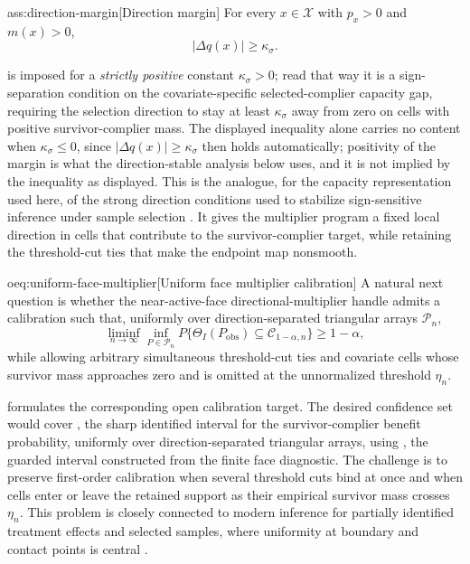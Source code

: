 \documentclass[11pt]{article}
\begin{document}
\begin{assumptionv}{ass:direction-margin}[Direction margin]
For every \(x\in\mathcal X\) with \(p_x>0\) and \(m(x)>0\),
\[
|\Delta q(x)|\ge \kappa_{\sigma}.
\]
\end{assumptionv}

 is imposed for a \emph{strictly positive} constant \(\kappa_{\sigma}>0\); read that way it is a sign-separation condition on the covariate-specific selected-complier capacity gap, requiring the selection direction to stay at least \(\kappa_{\sigma}\) away from zero on cells with positive survivor-complier mass.  The displayed inequality alone carries no content when \(\kappa_{\sigma}\le 0\), since \(|\Delta q(x)|\ge\kappa_{\sigma}\) then holds automatically; positivity of the margin is what the direction-stable analysis below uses, and it is not implied by the inequality as displayed.  This is the analogue, for the capacity representation used here, of the strong direction conditions used to stabilize sign-sensitive inference under sample selection \citep{Semenova2025}.  It gives the multiplier program a fixed local direction in cells that contribute to the survivor-complier target, while retaining the threshold-cut ties that make the endpoint map nonsmooth.

\begin{remarkv}{oeq:uniform-face-multiplier}[Uniform face multiplier calibration]
A natural next question is whether the near-active-face directional-multiplier handle admits a calibration such that, uniformly over direction-separated triangular arrays \(\mathcal P_n\),
\[
\liminf_{n\to\infty}\inf_{P\in\mathcal P_n}
P\{\Theta_I(P_{\mathrm{obs}})\subseteq\mathcal C_{1-\alpha,n}\}
\ge 1-\alpha,
\]
while allowing arbitrary simultaneous threshold-cut ties and covariate cells whose survivor mass approaches zero and is omitted at the unnormalized threshold \(\eta_n\).
\end{remarkv}

 formulates the corresponding open calibration target.  The desired confidence set would cover , the sharp identified interval for the survivor-complier benefit probability, uniformly over direction-separated triangular arrays, using , the guarded interval constructed from the finite face diagnostic.  The challenge is to preserve first-order calibration when several threshold cuts bind at once and when cells enter or leave the retained support as their empirical survivor mass crosses \(\eta_n\).  This problem is closely connected to modern inference for partially identified treatment effects and selected samples, where uniformity at boundary and contact points is central \citep{LeeLiu2024,BartalottiKedagniPossebom2023}.
\end{document}
